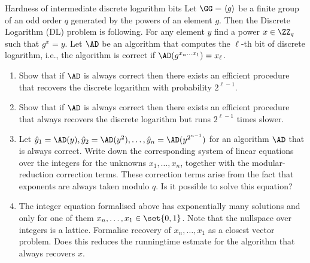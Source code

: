 \documentclass{crypto-exercise}
\author{Sven Laur}
\begin{document}
\begin{exercise}{Hardness of intermediate discrete logarithm bits}
  Let $\GG=\langle g\rangle$ be a finite group of an odd order $q$
  generated by the powers of an element $g$. Then the Discrete
  Logarithm (DL) problem is following. For any element $y$ find a
  power $x\in\ZZ_q$ such that $g^x=y$. Let $\AD$ be an algorithm that computes the $\ell$-th bit of discrete logarithm, i.e., the algorithm is correct if $\AD(g^{x_n\ldots x_1})=x_\ell$. 
  
  
  \begin{enumerate}
  \item Show that if $\AD$ is always correct then there exists an efficient procedure that recovers the discrete logarithm with probability $2^{\ell-1}$.
  \item Show that if $\AD$ is always correct then there exists an efficient procedure that always recovers the discrete logarithm but runs $2^{\ell-1}$ times slower.
  \item   Let $\hat{y}_1=\AD(y),\hat{y}_2=\AD(y^2),\ldots, \hat{y}_n=\AD(y^{2^{n-1}})$ for an algorithm $\AD$ that is always correct. 
  Write down the corresponding system of linear equations over the integers for the unknowns 
$x_1,\ldots,x_n$, together with the modular-reduction correction terms. 
These correction terms arise from the fact that exponents are always taken modulo $q$. Is it possible to solve this equation?
\item[($\star$)] The integer equation formalised above has exponentially many solutions and only for one of them $x_n,\ldots,x_1\in\set{0,1}$. 
Note that the nullspace over integers is a lattice. Formalise recovery of  $x_n,\ldots,x_1$ as a closest vector problem. Does this reduces the runningtime estmate for the algorithm that always recovers $x$.
 \end{enumerate} 
\end{exercise}


\begin{solution}
\end{solution}
\end{document}
